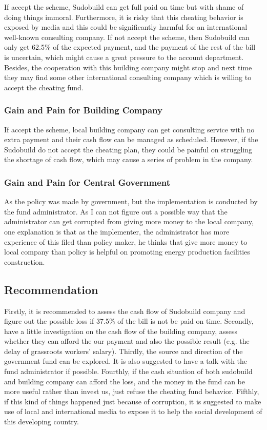 \documentclass[11pt, a4paper]{article}
\begin{document}
If accept the scheme, Sudobuild can get full paid on time but with shame of doing things immoral. Furthermore, it is risky that this cheating behavior is exposed by media and this could be significantly harmful for an international well-known consulting company. If not accept the scheme, then Sudobuild can only get 62.5\% of the expected payment, and the payment of the rest of the bill is uncertain, which might cause a great pressure to the account department. Besides, the cooperation with this building company might stop and next time they may find some other international consulting company which is willing to accept the cheating fund.

\subsubsection{Gain and Pain for Building Company}

If accept the scheme, local building company can get consulting service with no extra payment and their cash flow can be managed as scheduled. However, if the Sudobuild do not accept the cheating plan, they could be painful on struggling the shortage of cash flow, which may cause a series of problem in the company.

\subsubsection{Gain and Pain for Central Government}

As the policy was made by government, but the implementation is conducted by the fund administrator. As I can not figure out a possible way that the administrator can get corrupted from giving more money to the local company, one explanation is that as the implementer, the administrator has more experience of this filed than policy maker, he thinks that give more money to local company than policy is helpful on promoting energy production facilities construction.


\subsection{Recommendation}

Firstly, it is recommended to assess the cash flow of Sudobuild company and figure out the possible loss if 37.5\% of the bill is not be paid on time. Secondly, have a little investigation on the cash flow of the building company, assess whether they can afford the our payment and also the possible result (e.g. the delay of grassroots workers' salary). Thirdly, the source and direction of the government fund can be explored. It is also suggested to have a talk with the fund administrator if possible. Fourthly, if the cash situation of both sudobuild and building company can afford the loss, and the money in the fund can be more useful rather than invest us, just refuse the cheating fund behavior. Fifthly, if this kind of things happened just because of corruption, it is suggested to make use of local and international media to expose it to help the social development of this developing country.
\end{document}
